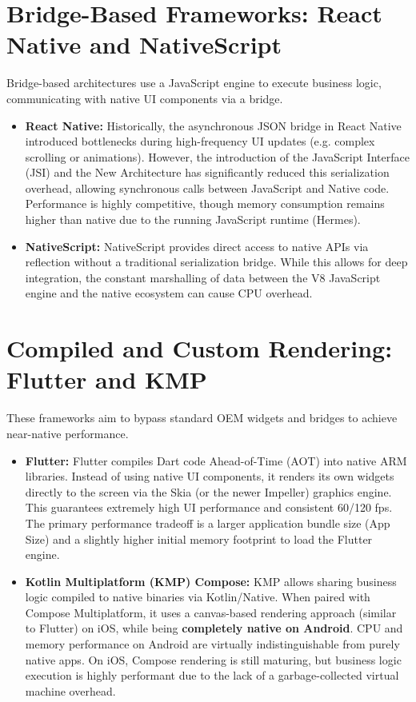 \section{Bridge-Based Frameworks: React Native and NativeScript}
Bridge-based architectures use a JavaScript engine to execute business logic, communicating with native UI components via a bridge.
\begin{itemize}
    \item \textbf{React Native:} Historically, the asynchronous JSON bridge in React Native introduced bottlenecks during high-frequency UI updates (e.g. complex scrolling or animations). However, the introduction of the JavaScript Interface (JSI) and the New Architecture has significantly reduced this serialization overhead, allowing synchronous calls between JavaScript and Native code. Performance is highly competitive, though memory consumption remains higher than native due to the running JavaScript runtime (Hermes). \cite{PF:RN:01}
    \item \textbf{NativeScript:} NativeScript provides direct access to native APIs via reflection without a traditional serialization bridge. While this allows for deep integration, the constant marshalling of data between the V8 JavaScript engine and the native ecosystem can cause CPU overhead.
\end{itemize}

\section{Compiled and Custom Rendering: Flutter and KMP}
These frameworks aim to bypass standard OEM widgets and bridges to achieve near-native performance.
\begin{itemize}
    \item \textbf{Flutter:} Flutter compiles Dart code Ahead-of-Time (AOT) into native ARM libraries. Instead of using native UI components, it renders its own widgets directly to the screen via the Skia (or the newer Impeller) graphics engine. This guarantees extremely high UI performance and consistent 60/120 fps. The primary performance tradeoff is a larger application bundle size (App Size) and a slightly higher initial memory footprint to load the Flutter engine. \cite{PF:FT:01}
    \item \textbf{Kotlin Multiplatform (KMP) Compose:} KMP allows sharing business logic compiled to native binaries via Kotlin/Native. When paired with Compose Multiplatform, it uses a canvas-based rendering approach (similar to Flutter) on iOS, while being \textbf{completely native on Android}. CPU and memory performance on Android are virtually indistinguishable from purely native apps. On iOS, Compose rendering is still maturing, but business logic execution is highly performant due to the lack of a garbage-collected virtual machine overhead. \cite{PF:KMM:01}
\end{itemize}

